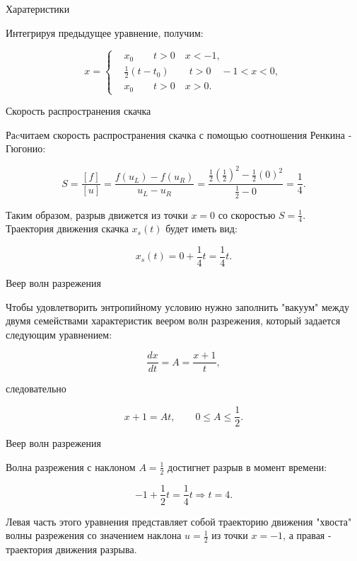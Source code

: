 \documentclass[10pt,xcolor=pst,aspectratio=169]{beamer}
\begin{document}
\begin{frame}{Харатеристики}

	\transdissolve[duration=0.1]
	\justifying
	\large

	Интегрируя предыдущее уравнение, получим:

	\[
		x =
			\begin{cases}
				&x_{0} \qquad t > 0 \quad x < -1,\\
				&\frac{1}{2}(t - t_{0})  \qquad t > 0 \quad -1 < x < 0,\\
				&x_{0} \qquad t > 0 \quad x > 0.
			\end{cases}
	\]

\end{frame}

\begin{frame}{Скорость распространения скачка}

	\transdissolve[duration=0.1]
	\justifying
	\large

	Раcчитаем скорость распространения скачка с помощью соотношения Ренкина - Гюгонио:

	\[
		S = \frac{[f]}{[u]} = \frac{f(u_{L}) - f(u_{R})}{u_{L} - u_{R}} = \frac{ \frac{1}{2} \left( \frac{1}{2} \right)^{2} - \frac{1}{2}  \left( 0 \right)^{2}}{ \frac{1}{2} - 0} = \frac{1}{4}.
	\]

	Таким образом, разрыв движется из точки $x = 0$ со скоростью $S = \frac{1}{4}$.\\

	Траектория движения скачка $x_{s}(t)$  будет иметь вид:

	\[
		x_{s}(t) = 0 + \frac{1}{4} t = \frac{1}{4} t.
	\]

\end{frame}

\begin{frame}{Веер волн разрежения}

	\transdissolve[duration=0.1]
	\justifying
	\large

	Чтобы удовлетворить энтропийному условию нужно заполнить "вакуум" между двумя семействами характеристик веером волн разрежения, который задается следующим уравнением:

	\[
		\frac{d x}{d t} = A = \frac{x + 1}{t},
	\]

	следовательно

	\[
		x + 1 = A t, \qquad 0 \leq A \leq \frac{1}{2}.
	\]

\end{frame}

\begin{frame}{Веер волн разрежения}

	\transdissolve[duration=0.1]
	\justifying
	\large

	Волна разрежения с наклоном $A = \frac{1}{2}$ достигнет разрыв в момент времени:

	\[
		- 1 + \frac{1}{2} t = \frac{1}{4} t \Rightarrow t = 4.
	\]

	Левая часть этого уравнения представляет собой траекторию движения "хвоста" волны разрежения со значением наклона $u = \frac{1}{2}$ из точки $x = -1$, а правая - траектория движения разрыва.

\end{frame}
\end{document}
